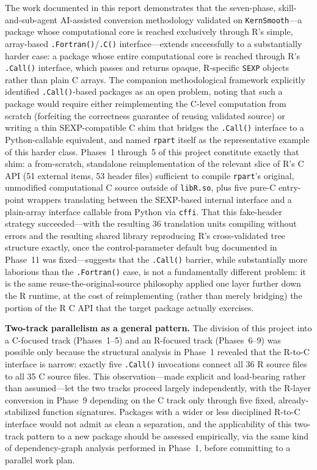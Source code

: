 \documentclass[12pt]{article}
\begin{document}
The work documented in this report demonstrates that the seven-phase, skill-and-sub-agent AI-assisted conversion methodology validated on \texttt{KernSmooth}---a package whose computational core is reached exclusively through R's simple, array-based \texttt{.Fortran()}/\texttt{.C()} interface---extends successfully to a substantially harder case: a package whose entire computational core is reached through R's \texttt{.Call()} interface, which passes and returns opaque, R-specific \texttt{SEXP} objects rather than plain C arrays. The companion methodological framework explicitly identified \texttt{.Call()}-based packages as an open problem, noting that such a package would require either reimplementing the C-level computation from scratch (forfeiting the correctness guarantee of reusing validated source) or writing a thin SEXP-compatible C shim that bridges the \texttt{.Call()} interface to a Python-callable equivalent, and named \texttt{rpart} itself as the representative example of this harder class. Phases~1 through~5 of this project constitute exactly that shim: a from-scratch, standalone reimplementation of the relevant slice of R's C API (51 external items, 53 header files) sufficient to compile \texttt{rpart}'s original, unmodified computational C source outside of \texttt{libR.so}, plus five pure-C entry-point wrappers translating between the SEXP-based internal interface and a plain-array interface callable from Python via \texttt{cffi}. That this fake-header strategy succeeded---with the resulting 36 translation units compiling without errors and the resulting shared library reproducing R's cross-validated tree structure exactly, once the control-parameter default bug documented in Phase~11 was fixed---suggests that the \texttt{.Call()} barrier, while substantially more laborious than the \texttt{.Fortran()} case, is not a fundamentally different problem: it is the same reuse-the-original-source philosophy applied one layer further down the R runtime, at the cost of reimplementing (rather than merely bridging) the portion of the R C API that the target package actually exercises.

\textbf{Two-track parallelism as a general pattern.} The division of this project into a C-focused track (Phases~1--5) and an R-focused track (Phases~6--9) was possible only because the structural analysis in Phase~1 revealed that the R-to-C interface is narrow: exactly five \texttt{.Call()} invocations connect all 36 R source files to all 35 C source files. This observation---made explicit and load-bearing rather than assumed---let the two tracks proceed largely independently, with the R-layer conversion in Phase~9 depending on the C track only through five fixed, already-stabilized function signatures. Packages with a wider or less disciplined R-to-C interface would not admit as clean a separation, and the applicability of this two-track pattern to a new package should be assessed empirically, via the same kind of dependency-graph analysis performed in Phase~1, before committing to a parallel work plan.
\end{document}
